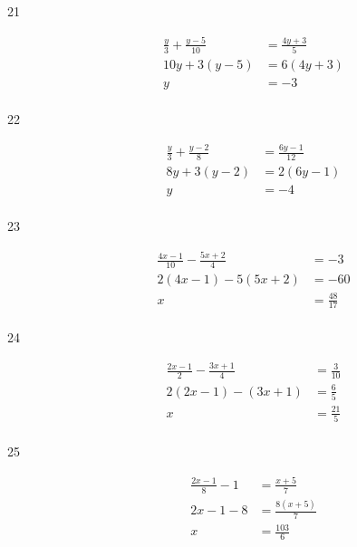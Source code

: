\documentclass[letterpaper, landscape]{exam}
\begin{document}
\begin{description}
      \item[21] 
        \begin{align*}
          \frac{y}{3} + \frac{y - 5}{10} & = \frac{4y + 3}{5} \\
          10y + 3(y - 5)                 & = 6 (4y + 3) \\
          y                              & = \boxed{ -3 } \\
        \end{align*}

      \item[22] 
        \begin{align*}
          \frac{y}{3} + \frac{y - 2}{8} & = \frac{6y - 1}{12} \\
          8y + 3(y - 2)                 & = 2(6y - 1) \\
          y                             & = \boxed{ -4 } \\
        \end{align*}

      \item[23] 
        \begin{align*}
          \frac{4x - 1}{10} - \frac{5x + 2}{4} & = -3 \\
          2(4x - 1) - 5(5x + 2)                & = -60 \\
          x                                    & = \boxed{ \frac{48}{17} } \\
        \end{align*}

      \item[24] 
        \begin{align*}
          \frac{2x - 1}{2} - \frac{3x + 1}{4} & = \frac{3}{10} \\
          2 (2x - 1) - (3x + 1)               & = \frac{6}{5} \\
          x                                   & = \boxed{ \frac{21}{5} } \\
        \end{align*}

      \item[25] 
        \begin{align*}
          \frac{2x - 1}{8} - 1 & = \frac{x + 5}{7} \\
          2x - 1 - 8           & = \frac{8(x + 5)}{7} \\
          x                    & = \boxed{ \frac{103}{6} } \\
        \end{align*}


\end{description}
\end{document}

